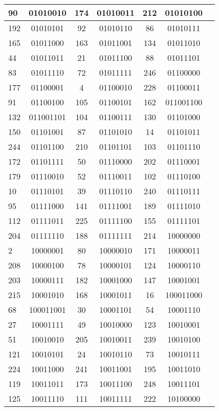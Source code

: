 \documentclass[conference,onecolumn,12pt]{IEEEtran}
\numberwithin{equation}{subsection}
\begin{document}
\begin{table}[h]
\begin{tabular}{lcccccc}
90 & 01010010 & 174 & 01010011 & 212 & 01010100 \\ \hline
192 & 01010101 & 92 & 01010110 & 86 & 01010111 \\ \hline
165 & 01011000 & 163 & 01011001 & 134 & 01011010 \\ \hline
44 & 01011011 & 21 & 01011100 & 88 & 01011101 \\ \hline
83 & 01011110 & 72 & 01011111 & 246 & 01100000 \\ \hline
177 & 01100001 & 4 & 01100010 & 228 & 01100011 \\ \hline
91 & 01100100 & 105 & 01100101 & 162 & 011001100 \\ \hline
132 & 011001101 & 104 & 01100111 & 130 & 01101000 \\ \hline
150 & 01101001 & 87 & 01101010 & 14 & 01101011 \\ \hline
244 & 01101100 & 210 & 01101101 & 103 & 01101110 \\ \hline
172 & 01101111 & 50 & 01110000 & 202 & 01110001 \\ \hline
179 & 01110010 & 52 & 01110011 & 102 & 01110100 \\ \hline
10 & 01110101 & 39 & 01110110 & 240 & 01110111 \\ \hline
95 & 01111000 & 141 & 01111001 & 189 & 01111010 \\ \hline
112 & 01111011 & 225 & 01111100 & 155 & 01111101 \\ \hline
204 & 01111110 & 188 & 01111111 & 214 & 10000000 \\ \hline
2 & 10000001 & 80 & 10000010 & 171 & 10000011 \\ \hline
208 & 10000100 & 78 & 10000101 & 124 & 10000110 \\ \hline
203 & 10000111 & 182 & 10001000 & 147 & 10001001 \\ \hline
215 & 10001010 & 168 & 10001011 & 16 & 100011000 \\ \hline
68 & 100011001 & 30 & 10001101 & 54 & 10001110 \\ \hline
27 & 10001111 & 49 & 10010000 & 123 & 10010001 \\ \hline
51 & 10010010 & 205 & 10010011 & 239 & 10010100 \\ \hline
121 & 10010101 & 24 & 10010110 & 73 & 10010111 \\ \hline
224 & 10011000 & 241 & 10011001 & 195 & 10011010 \\ \hline
119 & 10011011 & 173 & 10011100 & 248 & 10011101 \\ \hline
125 & 10011110 & 111 & 10011111 & 222 & 10100000 \\ \hline

\end{tabular}
\end{table}
\end{document}
